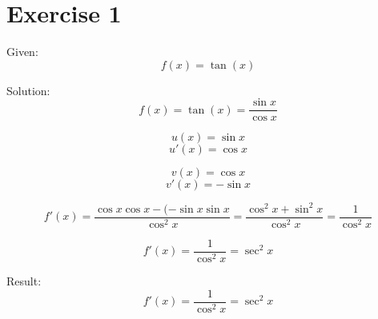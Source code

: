 \documentclass[a4paper, 10pt]{scrartcl}
\begin{document}
\section{Exercise 1}

Given:
\[f(x) = \tan(x)\]

Solution:
\[f(x) = \tan(x) = \frac{\sin{x}}{\cos{x}}\]

\[u(x) = \sin{x}\]
\[u'(x) = \cos{x}\]

\[v(x) = \cos{x}\]
\[v'(x) = -\sin{x}\]

\[f'(x) = \frac{\cos{x}\cos{x} - (-\sin{x}\sin{x}}{\cos^{2}{x}} =
         \frac{\cos^{2}{x} + \sin^{2}{x}}{\cos^{2}{x}} = \frac{1}{\cos^{2}{x}}\]

\[f'(x) = \frac{1}{\cos^{2}{x}} = \sec^{2}{x}\]


Result:
\[f'(x) = \frac{1}{\cos^{2}{x}} = \sec^{2}{x}\]
\end{document}
